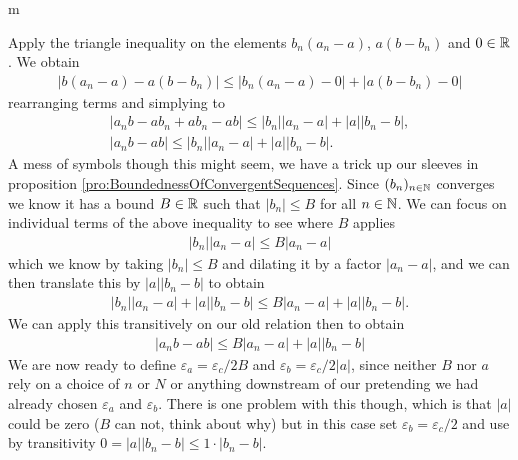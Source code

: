 \documentclass[11pt]{article}
\begin{document}
\begin{my proof}{m}
\begin{enumerate}
Apply the triangle inequality on the elements $b_n(a_n - a)$, $a (b - b_n)$ and $0 \in \mathbb{R}$. We obtain \begin{gather*}
|b(a_n - a) - a(b - b_n)| \le |b_n(a_n - a) - 0| + |a (b - b_n) - 0|
\end{gather*}
rearranging terms and simplying to \begin{gather*}
|a_n b - a b_n + a b_n - ab| \le |b_n| |a_n - a| + |a||b_n - b|, \\
|a_n b - a b| \le |b_n| |a_n - a| + |a| |b_n - b|.
\end{gather*}
A mess of symbols though this might seem, we have a trick up our sleeves in proposition \ref{pro:BoundednessOfConvergentSequences}. Since $(b_n)_{n\in \mathbb{N}}$ converges we know it has a bound $B \in \mathbb{R}$ such that $|b_n| \le B$ for all $n \in \mathbb{N}$. We can focus on individual terms of the above inequality to see where $B$ applies \begin{gather*}
|b_n| |a_n - a| \le B |a_n - a|
\end{gather*}
which we know by taking $|b_n| \le B$ and dilating it by a factor $|a_n - a|$, and we can then translate this by $|a| |b_n - b|$ to obtain \begin{gather*}
|b_n| |a_n - a| + |a| |b_n - b| \le B |a_n - a| + |a| |b_n - b|.
\end{gather*}
We can apply this transitively on our old relation then to obtain \begin{gather*}
|a_n b - a b| \le B |a_n - a| + |a| |b_n - b|
\end{gather*}
We are now ready to define $\varepsilon_a = \varepsilon_c/2B$ and $\varepsilon_b = \varepsilon_c/2|a|$, since neither $B$ nor $a$ rely on a choice of $n$ or $N$ or anything downstream of our pretending we had already chosen $\varepsilon_a$ and $\varepsilon_b$. There is one problem with this though, which is that $|a|$ could be zero ($B$ can not, think about why) but in this case set $\varepsilon_b = \varepsilon_c / 2$ and use by transitivity $0 = |a||b_n - b| \le 1 \cdot |b_n - b|$.


\end{enumerate}
\end{my proof}
\end{document}
